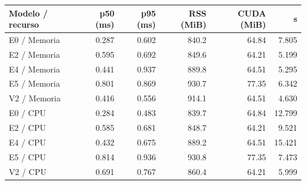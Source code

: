 \begin{tabular}{lrrrrr}
\toprule
Modelo / recurso & p50 (ms) & p95 (ms) & RSS (MiB) & CUDA (MiB) & s \\
\midrule
E0 / Memoria & 0.287 & 0.602 & 840.2 & 64.84 & 7.805 \\
E2 / Memoria & 0.595 & 0.692 & 849.6 & 64.21 & 5.199 \\
E4 / Memoria & 0.441 & 0.937 & 889.8 & 64.51 & 5.295 \\
E5 / Memoria & 0.801 & 0.869 & 930.7 & 77.35 & 6.342 \\
V2 / Memoria & 0.416 & 0.556 & 914.1 & 64.51 & 4.630 \\
E0 / CPU & 0.284 & 0.483 & 839.7 & 64.84 & 12.799 \\
E2 / CPU & 0.585 & 0.681 & 848.7 & 64.21 & 9.521 \\
E4 / CPU & 0.432 & 0.675 & 889.2 & 64.51 & 15.421 \\
E5 / CPU & 0.814 & 0.936 & 930.8 & 77.35 & 7.473 \\
V2 / CPU & 0.691 & 0.767 & 860.4 & 64.21 & 5.999 \\
\bottomrule
\end{tabular}
